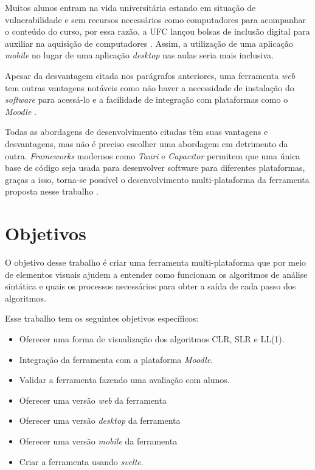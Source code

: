 Muitos alunos entram na vida universitária estando em situação de vulnerabilidade e sem recursos necessários como computadores para acompanhar o conteúdo do curso, por essa razão, a UFC lançou bolsas de inclusão digital para auxiliar na aquisição de computadores \cite{povo_ufc_2020}. Assim, a utilização de uma aplicação \textit{mobile} no lugar de uma aplicação \textit{desktop} nas aulas seria mais inclusiva.

Apesar da desvantagem citada nos parágrafos anteriores, uma ferramenta \textit{web} tem outras vantagens notáveis como não haver a necessidade de instalação do \textit{software} para acessá-lo e a facilidade de integração com plataformas como o \textit{Moodle} \cite{desai_web_2022}. 

Todas as abordagens de desenvolvimento citadas têm suas vantagens e desvantagens, mas não é preciso  escolher uma abordagem em detrimento da outra. \textit{Frameworks} modernos como \textit{Tauri} e \textit{Capacitor} permitem que uma única base de código seja usada para desenvolver software para diferentes plataformas, graças a isso, torna-se possível o desenvolvimento multi-plataforma da ferramenta proposta nesse trabalho \cite{shevtsiv2021cross}.


\section{Objetivos}
O objetivo desse trabalho é criar uma ferramenta multi-plataforma que por meio de elementos visuais ajudem a entender como funcionam os algoritmos de análise sintática e quais os processos necessários para obter a saída de cada passo dos algoritmos.

Esse trabalho tem os seguintes objetivos específicos:
\begin{itemize}[label=$\sbullet$]
    \item Oferecer uma forma de visualização dos algoritmos CLR, SLR e LL(1).
    \item Integração da ferramenta com a plataforma \textit{Moodle}.
    \item Validar a ferramenta fazendo uma avaliação com alunos.
    \item Oferecer uma versão \textit{web} da ferramenta
    \item Oferecer uma versão \textit{desktop} da ferramenta
    \item Oferecer uma versão \textit{mobile} da ferramenta
    \item Criar a ferramenta usando \textit{svelte}.
\end{itemize}

